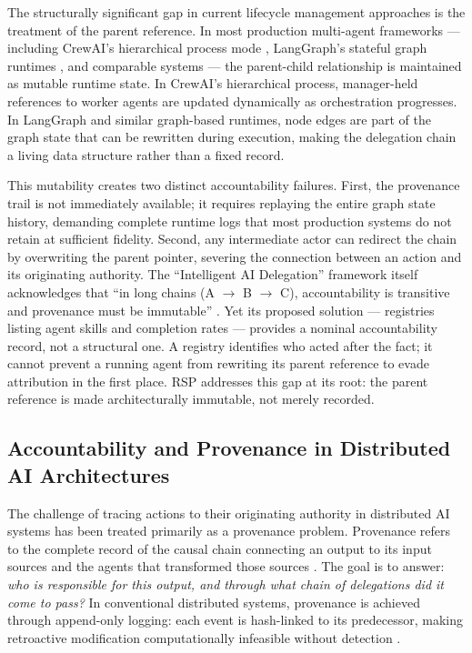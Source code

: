 The structurally significant gap in current lifecycle management approaches is the treatment of the parent reference. In most production multi-agent frameworks — including CrewAI's hierarchical process mode \cite{zylos2026}, LangGraph's stateful graph runtimes \cite{heavybit2025multiagent}, and comparable systems — the parent-child relationship is maintained as mutable runtime state. In CrewAI's hierarchical process, manager-held references to worker agents are updated dynamically as orchestration progresses. In LangGraph and similar graph-based runtimes, node edges are part of the graph state that can be rewritten during execution, making the delegation chain a living data structure rather than a fixed record.

This mutability creates two distinct accountability failures. First, the provenance trail is not immediately available; it requires replaying the entire graph state history, demanding complete runtime logs that most production systems do not retain at sufficient fidelity. Second, any intermediate actor can redirect the chain by overwriting the parent pointer, severing the connection between an action and its originating authority. The ``Intelligent AI Delegation'' framework itself acknowledges that ``in long chains (A $\rightarrow$ B $\rightarrow$ C), accountability is transitive and provenance must be immutable'' \cite[intelligent_ai_delegation]{arxiv2602.11865}. Yet its proposed solution — registries listing agent skills and completion rates — provides a nominal accountability record, not a structural one. A registry identifies who acted after the fact; it cannot prevent a running agent from rewriting its parent reference to evade attribution in the first place. RSP addresses this gap at its root: the parent reference is made architecturally immutable, not merely recorded.

\subsection{Accountability and Provenance in Distributed AI Architectures}\label{sec:provenance}

The challenge of tracing actions to their originating authority in distributed AI systems has been treated primarily as a provenance problem. Provenance refers to the complete record of the causal chain connecting an output to its input sources and the agents that transformed those sources \cite{on_chain_provenance_ai}. The goal is to answer: \emph{who is responsible for this output, and through what chain of delegations did it come to pass?} In conventional distributed systems, provenance is achieved through append-only logging: each event is hash-linked to its predecessor, making retroactive modification computationally infeasible without detection \cite{blockchain_ai_governance}.

